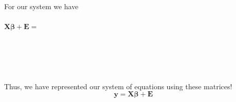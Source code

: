 \begin{enumerate}
For our system we have \\~\\
$\textbf{X}\boldsymbol{\beta}+\textbf{E}=$\\~\\~\\~\\~\\~\\
Thus, we have represented our system of equations using these matrices!
$$\textbf{y}=\textbf{X}\boldsymbol{\beta}+\textbf{E}$$~\\


\end{enumerate}
